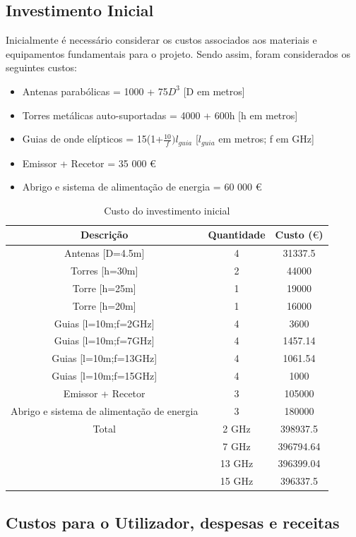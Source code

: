 \subsection{Investimento Inicial}
Inicialmente é necessário considerar os custos associados aos materiais e equipamentos fundamentais para o projeto. Sendo assim, foram considerados os seguintes custos:
\begin{itemize}
\item Antenas parabólicas = 1000 + 75$D^3$	[D em metros]
\item Torres metálicas auto-suportadas = 4000 + 600h	[h em metros]
\item Guias de onde elípticos = 15(1+$\frac{10}{f})l_{guia}$	[$l_{guia}$ em metros; f em GHz]
\item Emissor + Recetor = 35 000 $\euro$
\item Abrigo e sistema de alimentação de energia = 60 000 $\euro$
\end{itemize}

\begin{table}[H]
\centering
\begin{tabular}{|c|cc|}
\hline
Descrição & Quantidade & Custo ($\euro$)\\
\hline
Antenas [D=4.5m] & 4 & 31337.5\\
Torres [h=30m] & 2 & 44000\\
Torre [h=25m] & 1 & 19000\\
Torre [h=20m] & 1 & 16000\\
Guias [l=10m;f=2GHz] & 4 & 3600 \\
Guias [l=10m;f=7GHz] & 4 & 1457.14 \\
Guias [l=10m;f=13GHz] & 4 & 1061.54 \\
Guias [l=10m;f=15GHz] & 4 & 1000 \\
Emissor + Recetor & 3 & 105000\\
Abrigo e sistema de alimentação de energia & 3 & 180000\\
\hline
Total & 2 GHz & 398937.5\\
 & 7 GHz & 396794.64\\
 & 13 GHz & 396399.04\\
 & 15 GHz & 396337.5\\
\hline
\end{tabular}
\caption{Custo do investimento inicial}
\label{custo_ini}
\end{table}

\subsection{Custos para o Utilizador, despesas e receitas}

